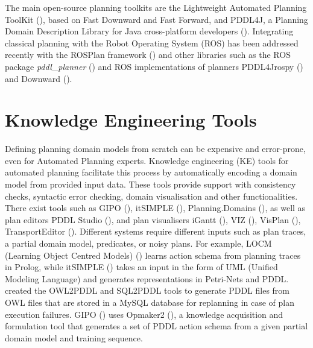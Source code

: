 The main open-source planning toolkits are the Lightweight Automated Planning ToolKit (\cite{lapkt}), based on Fast Downward and Fast Forward, and PDDL4J, a Planning Domain Description Library for Java cross-platform developers (\cite{pellier2018pddl4j}).
Integrating classical planning with the Robot Operating System (ROS) has been addressed recently \eg with the ROSPlan framework (\cite{cashmore2015rosplan}) and other libraries such as the ROS package \textit{pddl_planner} (\cite{pddlplanner}) and ROS implementations of planners \eg PDDL4Jrospy (\cite{pddl4jrospy}) and Downward (\cite{downward}).


\section{Knowledge Engineering Tools}\label{subsec:Knowledge Engineering}
Defining planning domain models from scratch can be expensive and error-prone, even for Automated Planning experts.
Knowledge engineering (KE) tools for automated planning facilitate this process by automatically encoding a domain model from provided input data.
These tools provide support with consistency checks, syntactic error checking, domain visualisation and other functionalities.
There exist tools such as GIPO (\cite{simpson2007planning}), itSIMPLE (\cite{vaquero2013itsimple}), Planning.Domains (\cite{muise2016planning}), 
as well as plan editors \eg PDDL Studio (\cite{plch2012inspect}), and plan visualisers \eg iGantt (\cite{bartak2009local}), VIZ (\cite{vodrazka2010visual}), VisPlan (\cite{glinsky2011visplan}), TransportEditor (\cite{vskopek2017transporteditor}).
Different systems require different inputs such as plan traces, a partial domain model, predicates, or noisy plans.
For example, LOCM (Learning Object Centred Models) (\cite{cresswell2013acquiring}) learns action schema from planning traces in Prolog, 
while itSIMPLE () takes an input in the form of UML (Unified Modeling Language) %
and generates representations in Petri-Nets %
and PDDL. 
\cite{kootbally2015towards} created the OWL2PDDL and SQL2PDDL tools to generate PDDL files from OWL files that are stored in a MySQL database for replanning in case of plan execution failures.
GIPO () uses Opmaker2 (\cite{mccluskey2009automated}), a knowledge acquisition and formulation tool that generates a set of PDDL action schema from a given partial domain model and training sequence.

